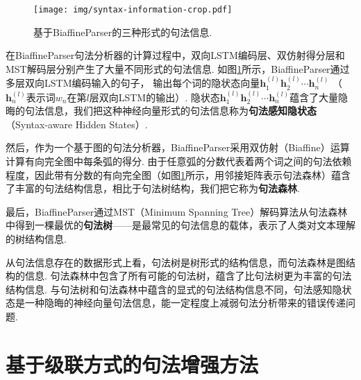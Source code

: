\begin{figure}[hb]
    \centering
    \texttt{[image: img/syntax-information-crop.pdf]}
    \caption{基于BiaffineParser的三种形式的句法信息. }
    \label{fig:syntax-information}
\end{figure}

在BiaffineParser句法分析器的计算过程中，双向LSTM编码层、双仿射得分层和MST解码层分别产生了大量不同形式的句法信息.
如图\ref{fig:syntax-information}所示，BiaffineParser通过多层双向LSTM编码输入的句子，
输出每个词的隐状态向量$\mathbf{h}_1^{(l)}\mathbf{h}_2^{(l)}\cdots \mathbf{h}_n^{(l)}$ （ $\mathbf{h}_n^{(l)}$表示词$w_n$在第$l$层双向LSTM的输出）.  隐状态$\mathbf{h}_1^{(l)}\mathbf{h}_2^{(l)} \cdots \mathbf{h}_n^{(l)}$蕴含了大量隐晦的句法信息，我们把这种神经向量形式的句法信息称为\textbf{句法感知隐状态}（Syntax-aware Hidden States）.

然后，作为一个基于图的句法分析器，BiaffineParser采用双仿射（Biaffine）运算计算有向完全图中每条弧的得分. 由于任意弧的分数代表着两个词之间的句法依赖程度，因此带有分数的有向完全图（如图\ref{fig:syntax-information}所示，用邻接矩阵表示句法森林）蕴含了丰富的句法结构信息，相比于句法树结构，我们把它称为\textbf{句法森林}.

最后，BiaffineParser通过MST（Minimum Spanning Tree）解码算法从句法森林中得到一棵最优的\textbf{句法树}——是最常见的句法信息的载体，表示了人类对文本理解的树结构信息.

从句法信息存在的数据形式上看，句法树是树形式的结构信息，而句法森林是图结构的信息.
句法森林中包含了所有可能的句法树，蕴含了比句法树更为丰富的句法结构信息.
与句法树和句法森林中蕴含的显式的句法结构信息不同，句法感知隐状态是一种隐晦的神经向量句法信息，能一定程度上减弱句法分析带来的错误传递问题.


\section{基于级联方式的句法增强方法}
\label{sec:orl_pipeline}


